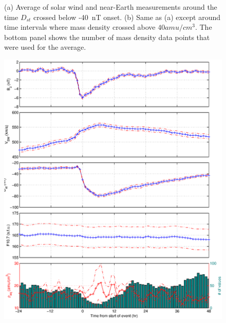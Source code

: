 \documentclass[10pt,twocolumn]{article}
\begin{document}
\begin{figure}[htp!]
\caption{(a) Average of solar wind and near-Earth measurements around the time $D_{st}$ crossed below -40~nT onset. (b) Same as (a) except around time intervals where mass density crossed above $40 amu/cm^3$.  The bottom panel shows the number of mass density data points that were used for the average.}
\label{MassStorm}
\end{figure}
\clearpage

\begin{figure}[htp!]
\centering
\includegraphics[scale=0.5]{paperfigures/stormavs-dd12.eps}

\end{figure}
\end{document}
